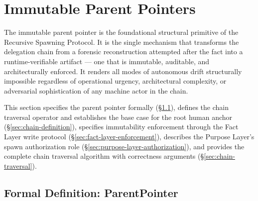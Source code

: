 \section{Immutable Parent Pointers}
\label{sec:immutable-parent-pointers}

The immutable parent pointer is the foundational structural primitive of the Recursive Spawning Protocol. It is the single mechanism that transforms the delegation chain from a forensic reconstruction attempted after the fact into a runtime-verifiable artifact --- one that is immutable, auditable, and architecturally enforced. It renders all modes of autonomous drift structurally impossible regardless of operational urgency, architectural complexity, or adversarial sophistication of any machine actor in the chain.

This section specifies the parent pointer formally (\S\ref{sec:parent-pointer-formal}), defines the chain traversal operator and establishes the base case for the root human anchor (\S\ref{sec:chain-definition}), specifies immutability enforcement through the Fact Layer write protocol (\S\ref{sec:fact-layer-enforcement}), describes the Purpose Layer's spawn authorization role (\S\ref{sec:purpose-layer-authorization}), and provides the complete chain traversal algorithm with correctness arguments (\S\ref{sec:chain-traversal}).

\subsection{Formal Definition: ParentPointer}
\label{sec:parent-pointer-formal}

